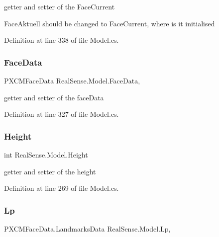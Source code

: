 getter and setter of the Face\+Current

Face\+Aktuell should be changed to Face\+Current, where is it initialised 

Definition at line 338 of file Model.\+cs.

\mbox{\label{class_real_sense_1_1_model_a0d16c2536a9f3c346cc3d51b3227989e}} 
\subsubsection{\texorpdfstring{Face\+Data}{FaceData}}
{\footnotesize\ttfamily P\+X\+C\+M\+Face\+Data Real\+Sense.\+Model.\+Face\+Data\hspace{0.3cm}{\ttfamily [get]}, {\ttfamily [set]}}

getter and setter of the face\+Data 

Definition at line 327 of file Model.\+cs.

\mbox{\label{class_real_sense_1_1_model_abf6324c9f4acc3134909a239eff37a0a}} 
\subsubsection{\texorpdfstring{Height}{Height}}
{\footnotesize\ttfamily int Real\+Sense.\+Model.\+Height\hspace{0.3cm}{\ttfamily [get]}}

getter and setter of the height 

Definition at line 269 of file Model.\+cs.

\mbox{\label{class_real_sense_1_1_model_a3e349d000d00015a340954ec3be977ea}} 
\subsubsection{\texorpdfstring{Lp}{Lp}}
{\footnotesize\ttfamily P\+X\+C\+M\+Face\+Data.\+Landmarks\+Data Real\+Sense.\+Model.\+Lp\hspace{0.3cm}{\ttfamily [get]}, {\ttfamily [set]}}

